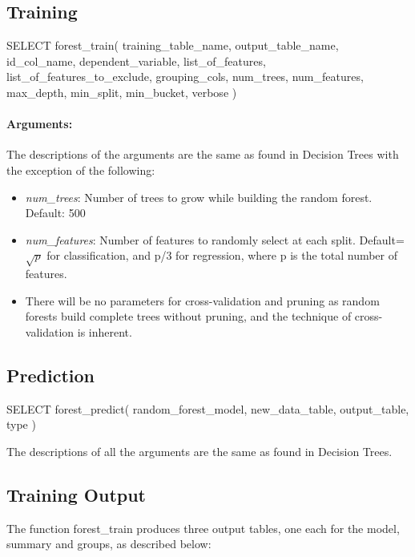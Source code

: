 \subsection{Training} %
\label{sub:training}
\begin{sql}
    SELECT forest_train(
            training_table_name,
            output_table_name,
            id_col_name,
            dependent_variable,
            list_of_features,
            list_of_features_to_exclude,
            grouping_cols,
            num_trees,
            num_features,
            max_depth,
            min_split,
            min_bucket,
            verbose
    )
\end{sql}

\paragraph{Arguments:}

The descriptions of the arguments are the same as found in Decision Trees with the exception
of the following:

\begin{itemize}
    \item \emph{num\_trees}: Number of trees to grow while building the random forest. Default: 500
    \item \emph{num\_features}: Number of features to randomly select at each split. Default=$\sqrt{p}$ for
    classification, and p/3 for regression, where p is the total number of features.
    \item There will be no parameters for cross-validation and pruning as random forests build complete
    trees without pruning, and the technique of cross-validation is inherent.
\end{itemize}

\subsection{Prediction} %
\label{sub:prediction}
\begin{sql}
    SELECT forest_predict(
            random_forest_model,
            new_data_table,
            output_table,
            type
    )
\end{sql}
The descriptions of all the arguments are the same as found in Decision Trees.
\\
\subsection{Training Output} %
\label{sub:training_out}
The function forest\_train produces three output tables, one each for the model, summary 
and groups, as described below:

